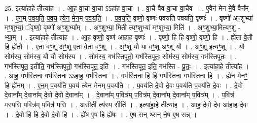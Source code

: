 \documentclass[17pt]{extarticle}
\begin{document}
25. इत्या॑हा॒हे तीत्या॑ह । . आ॒ह॒ वा॒चा वा॒चा ऽऽहा॑ह वा॒चा । . वा॒चै वैव वा॒चा वा॒चैव । . ए॒वैन॑ मेन मे॒वै वैन᳚म् । . ए॒न॒म् प॒व॒य॒ति॒ प॒व॒य॒ त्ये॒न॒ मे॒न॒म् प॒व॒य॒ति॒ । . प॒व॒य॒ति॒ वृष्णो॒ वृष्णः॑ पवयति पवयति॒ वृष्णः॑ । . वृष्णो॑ अꣳ॒॒शुभ्या॑ मꣳ॒॒शुभ्यां॒ ॅवृष्णो॒ वृष्णो॑ अꣳ॒॒शुभ्या᳚म् । . अꣳ॒॒शुभ्या॒ मिती त्यꣳ॒॒शुभ्या॑ मꣳ॒॒शुभ्या॒ मिति॑ । . अꣳ॒॒शुभ्या॒मित्यꣳ॒॒शु - भ्या॒म् । . इत्या॑हा॒हे तीत्या॑ह । . आ॒ह॒ वृष्णो॒ वृष्ण॑ आहाह॒ वृष्णः॑ । . वृष्णो॒ हि हि वृष्णो॒ वृष्णो॒ हि । . ह्ये॑ता वे॒तौ हि ह्ये॑तौ । . ए॒ता वꣳ॒॒शू अꣳ॒॒शू ए॒ता वे॒ता वꣳ॒॒शू । . अꣳ॒॒शू यौ या वꣳ॒॒शू अꣳ॒॒शू यौ । . अꣳ॒॒शू इत्यꣳ॒॒शू । . यौ सोम॑स्य॒ सोम॑स्य॒ यौ यौ सोम॑स्य । . सोम॑स्य॒ गभ॑स्तिपूतो॒ गभ॑स्तिपूतः॒ सोम॑स्य॒ सोम॑स्य॒ गभ॑स्तिपूतः । . गभ॑स्तिपूत॒ इतीति॒ गभ॑स्तिपूतो॒ गभ॑स्तिपूत॒ इति॑ । . गभ॑स्तिपूत॒ इति॒ गभ॑स्ति - पू॒तः॒ । . इत्या॑हा॒हे तीत्या॑ह । . आ॒ह॒ गभ॑स्तिना॒ गभ॑स्तिना ऽऽहाह॒ गभ॑स्तिना । . गभ॑स्तिना॒ हि हि गभ॑स्तिना॒ गभ॑स्तिना॒ हि । . ह्ये॑न मेनꣳ॒॒ हि ह्ये॑नम् । . ए॒न॒म् प॒वय॑ति प॒वय॑ त्येन मेनम् प॒वय॑ति । . प॒वय॑ति दे॒वो दे॒वः प॒वय॑ति प॒वय॑ति दे॒वः । . दे॒वो दे॒वाना᳚म् दे॒वाना᳚म् दे॒वो दे॒वो दे॒वाना᳚म् । . दे॒वाना᳚म् प॒वित्र॑म् प॒वित्र॑म् दे॒वाना᳚म् दे॒वाना᳚म् प॒वित्र᳚म् । . प॒वित्र॑ मस्यसि प॒वित्र॑म् प॒वित्र॑ मसि । . अ॒सीती त्य॑स्य॒ सीति॑ । . इत्या॑हा॒हे तीत्या॑ह । . आ॒ह॒ दे॒वो दे॒व आ॑हाह दे॒वः । . दे॒वो हि हि दे॒वो दे॒वो हि । . ह्ये॑ष ए॒ष हि ह्ये॑षः । . ए॒ष सन् थ्सन् ने॒ष ए॒ष सन्न् । \newline
\end{document}
